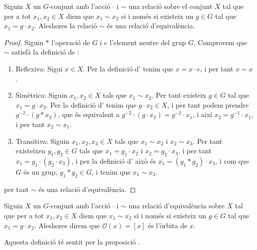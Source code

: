 \documentclass[../Apunts.tex]{subfiles}
\begin{document}
	\begin{proposition}
		\label{prop:relacio d'òrbites és d'equivalència}
		Siguin \(X\) un \(G\)-conjunt amb l'acció \(\cdot\) i \(\sim\) una relació sobre el conjunt \(X\) tal que per a tot \(x_{1},x_{2}\in X\) diem que \(x_{1}\sim x_{2}\) si i només si existeix un \(g\in G\) tal que \(x_{1}=g\cdot x_{2}\). Aleshores la relació \(\sim\) és una relació d'equivalència.
		\begin{proof}
			Siguin \(\ast\) l'operació de \(G\) i \(e\) l'element neutre del grup \(G\). Comprovem que \(\sim\) satisfà la definició de :
			\begin{enumerate}
				\item Reflexiva: Sigui \(x\in X\). Per la definició d' tenim que \(x=x\cdot e\), i per tant \(x\sim x\).
				\item Simètrica: Siguin \(x_{1},x_{2}\in X\) tals que \(x_{1}\sim x_{2}\). Per tant existeix \(g\in G\) tal que \(x_{1}=g\cdot x_{2}\). Per la definició d' tenim que \(g\cdot x_{2}\in X\), i per tant podem prendre \(g^{-2}\cdot(g\ast x_{2})\), que és equivalent a \(g^{-2}\cdot(g\cdot x_{2})=g^{-2}\cdot x_{1}\), i així \(x_{2}=g^{-1}\cdot x_{1}\), i per tant \(x_{2}\sim x_{1}\).
				\item Transitiva: Siguin \(x_{1},x_{2},x_{3}\in X\) tals que \(x_{1}\sim x_{2}\) i \(x_{2}\sim x_{3}\). Per tant existeixen \(g_{1},g_{2}\in G\) tals que \(x_{1}=g_{1}\cdot x_{2}\) i \(x_{2}=g_{2}\cdot x_{3}\), i per tant \(x_{1}=g_{1}\cdot(g_{2}\cdot x_{3})\), i per la definició d' això és \(x_{1}=(g_{1}\ast g_{2})\cdot x_{3}\), i com que \(G\) és un grup, \(g_{1}\ast g_{2}\in G\), i tenim que \(x_{1}\sim x_{3}\).
			\end{enumerate}
			per tant \(\sim\) és una relació d'equivalència.
		\end{proof}
	\end{proposition}
	\begin{definition}
		\label{def:òrbita d'un element d'un G-conjunt}
		Siguin \(X\) un \(G\)-conjunt amb l'acció \(\cdot\) i \(\sim\) una relació d'equivalència sobre \(X\) tal que per a tot \(x_{1},x_{2}\in X\) diem que \(x_{1}\sim x_{2}\) si i només si existeix un \(g\in G\) tal que \(x_{1}=g\cdot x_{2}\). Aleshores direm que \(\mathcal{O}(x)=[x]\) és l'òrbita de \(x\).
		
		Aquesta definició té sentit per la proposició .
	\end{definition}
\end{document}
